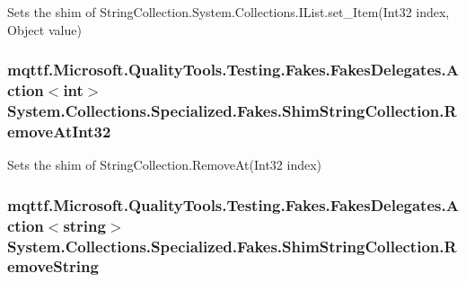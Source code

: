 Sets the shim of String\-Collection.\-System.\-Collections.\-I\-List.\-set\-\_\-\-Item(\-Int32 index, Object value)

\hypertarget{class_system_1_1_collections_1_1_specialized_1_1_fakes_1_1_shim_string_collection_a3657c38eec1068ad4436f8536933fd09}{
\subsubsection[{Remove\-At\-Int32}]{\setlength{\rightskip}{0pt plus 5cm}mqttf.\-Microsoft.\-Quality\-Tools.\-Testing.\-Fakes.\-Fakes\-Delegates.\-Action$<$int$>$ System.\-Collections.\-Specialized.\-Fakes.\-Shim\-String\-Collection.\-Remove\-At\-Int32\hspace{0.3cm}{\ttfamily [set]}}}\label{class_system_1_1_collections_1_1_specialized_1_1_fakes_1_1_shim_string_collection_a3657c38eec1068ad4436f8536933fd09}


Sets the shim of String\-Collection.\-Remove\-At(\-Int32 index)

\hypertarget{class_system_1_1_collections_1_1_specialized_1_1_fakes_1_1_shim_string_collection_af56cfae1b3e03074de7eb04ed5ee4acb}{
\subsubsection[{Remove\-String}]{\setlength{\rightskip}{0pt plus 5cm}mqttf.\-Microsoft.\-Quality\-Tools.\-Testing.\-Fakes.\-Fakes\-Delegates.\-Action$<$string$>$ System.\-Collections.\-Specialized.\-Fakes.\-Shim\-String\-Collection.\-Remove\-String\hspace{0.3cm}{\ttfamily [set]}}}\label{class_system_1_1_collections_1_1_specialized_1_1_fakes_1_1_shim_string_collection_af56cfae1b3e03074de7eb04ed5ee4acb}


